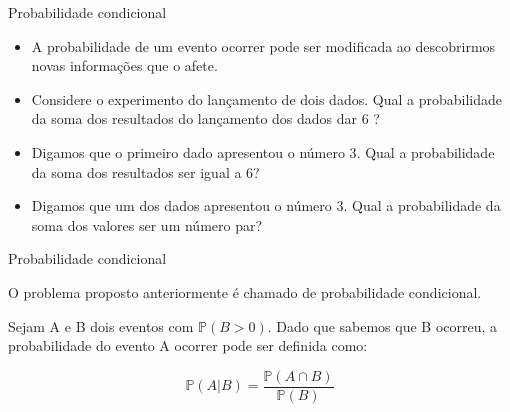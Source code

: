 

\begin{frame}{Probabilidade condicional}
    \begin{itemize}
        \item  A probabilidade de um evento ocorrer pode ser modificada ao descobrirmos novas informações que o afete.
        \pause 
        \item Considere o experimento do lançamento de dois dados. Qual a probabilidade da soma dos resultados do lançamento dos dados dar 6 ?
        \pause
        \item Digamos que o primeiro dado apresentou o número 3. Qual a probabilidade da soma dos resultados ser igual a 6?
        \pause
        \item Digamos que um dos dados apresentou o número 3. Qual a probabilidade da soma dos valores ser um número par?
    \end{itemize}
   

\end{frame}

\begin{frame}{Probabilidade condicional}

O problema proposto anteriormente é chamado de probabilidade condicional.

\begin{definicao}
    Sejam A e B dois eventos com $\mathds{P}(B>0)$. Dado que sabemos que B ocorreu, a probabilidade do evento A ocorrer pode ser definida como:

    $$\mathds{P}(A|B) = \dfrac{\mathds{P}(A \cap B)}{\mathds{P}(B)}$$
\end{definicao}
\end{frame}

